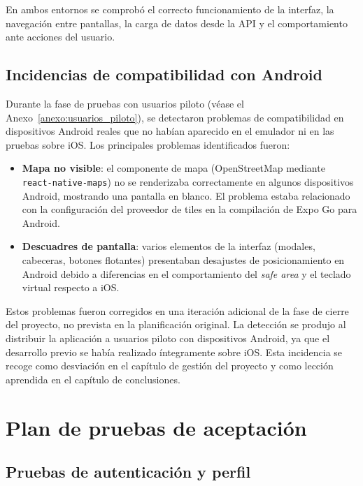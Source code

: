 En ambos entornos se comprobó el correcto funcionamiento de la interfaz, la navegación entre pantallas, la carga de datos desde la API y el comportamiento ante acciones del usuario.

\subsection{Incidencias de compatibilidad con Android}

Durante la fase de pruebas con usuarios piloto (véase el Anexo~\ref{anexo:usuarios_piloto}), se detectaron problemas de compatibilidad en dispositivos Android reales que no habían aparecido en el emulador ni en las pruebas sobre iOS. Los principales problemas identificados fueron:

\begin{itemize}
    \item \textbf{Mapa no visible}: el componente de mapa (OpenStreetMap mediante \texttt{react-native-maps}) no se renderizaba correctamente en algunos dispositivos Android, mostrando una pantalla en blanco. El problema estaba relacionado con la configuración del proveedor de tiles en la compilación de Expo Go para Android.

    \item \textbf{Descuadres de pantalla}: varios elementos de la interfaz (modales, cabeceras, botones flotantes) presentaban desajustes de posicionamiento en Android debido a diferencias en el comportamiento del \textit{safe area} y el teclado virtual respecto a iOS.
\end{itemize}

Estos problemas fueron corregidos en una iteración adicional de la fase de cierre del proyecto, no prevista en la planificación original. La detección se produjo al distribuir la aplicación a usuarios piloto con dispositivos Android, ya que el desarrollo previo se había realizado íntegramente sobre iOS. Esta incidencia se recoge como desviación en el capítulo de gestión del proyecto y como lección aprendida en el capítulo de conclusiones.

\section{Plan de pruebas de aceptación}

\subsection{Pruebas de autenticación y perfil}

